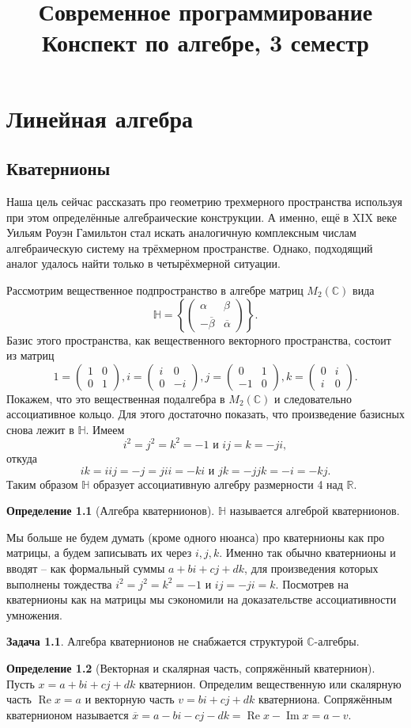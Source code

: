 \documentclass[10pt,a4paper,oneside]{book}
\title{Современное программирование \\ 
Конспект по алгебре, 3 семестр}
\date{}
\theoremstyle{definition}
\newtheorem{zad}{\color{violet!100!black}Задача}
\newtheorem*{defn}{\color{yellow!30!red} Определение}
\renewcommand{\Re}{\operatorname{Re}}
\newcommand{\mb}[1]{\mathbb{#1}}
\newcommand{\ovl}{\overline}
\renewcommand{\Im}{\operatorname{Im}}
\def\dfn{\begin{defn}}
\def\edfn{\end{defn}}
\def\zd{\begin{zad}}
\def\ezd{\end{zad}}
\def\pmat{\begin{pmatrix}}
\def\epmat{\end{pmatrix}}
\begin{document}
\tableofcontents

\chapter{Линейная алгебра}

\section{Кватернионы}


Наша цель сейчас рассказать про геометрию трехмерного пространства используя при этом определённые алгебраические конструкции. А именно, ещё в XIX веке Уильям Роуэн Гамильтон стал искать аналогичную комплексным числам алгебраическую систему на трёхмерном пространстве.  
Однако, подходящий аналог удалось найти только в четырёхмерной ситуации.


Рассмотрим вещественное подпространство в алгебре матриц $M_2(\mb C)$ вида
$$\mb H = \left\{\pmat \alpha & \beta \\ -\ovl{\beta} & \ovl{\alpha} \epmat \right\}.$$
Базис этого пространства, как вещественного векторного пространства, состоит из матриц 
$$ 1=\pmat 1 & 0 \\ 0& 1 \epmat, i= \pmat i & 0 \\ 0& -i \epmat, j=\pmat 0& 1 \\ -1 & 0 \epmat, k=\pmat 0 & i \\ i & 0\epmat. $$ 
Покажем, что это вещественная подалгебра в $M_2(\mb C)$ и следовательно ассоциативное кольцо. 
Для этого достаточно показать, что произведение базисных снова лежит в $\mb H$. Имеем $$i^2=j^2=k^2=-1 \text{ и } ij=k=-ji,$$ откуда $$ik= iij=-j=jii=-ki \text{ и } jk=-jjk=-i=-kj.$$ Таким образом $\mb H$ образует ассоциативную алгебру размерности 4 над $\mb R$.
 
\dfn[Алгебра кватернионов] $\mb H$ называется алгеброй кватернионов. 
\edfn
Мы больше не будем думать (кроме одного нюанса) про кватернионы как про матрицы, а будем записывать их через $i,j,k$. Именно так обычно кватернионы и вводят -- как формальный суммы $a+bi+cj+dk$, для произведения которых выполнены тождества $i^2=j^2=k^2=-1$ и $ij=-ji=k$. Посмотрев на кватернионы как на матрицы мы сэкономили на доказательстве ассоциативности умножения.

\zd Алгебра кватернионов не снабжается структурой $\mb C$-алгебры.
\ezd






\dfn[Векторная и скалярная часть, сопряжённый кватернион] Пусть $x= a+bi+cj+dk$ кватернион. Определим вещественную или скалярную часть $\Re x=a$ и векторную часть $v= bi+cj+dk$ кватерниона. Сопряжённым кватернионом называется $\ovl{x}= a-bi-cj-dk= \Re x - \Im x =a-v$. 
\edfn
\end{document}

